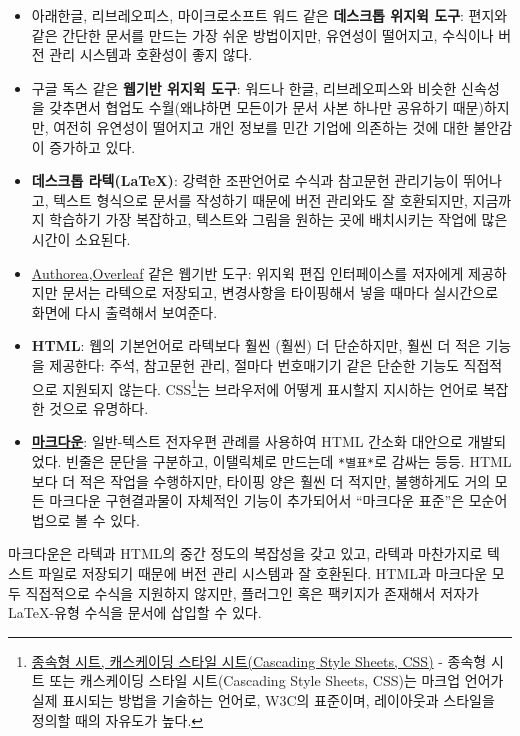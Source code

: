 \documentclass[
  letterpaper,
]{book}
\providecommand{\tightlist}{%
  \setlength{\itemsep}{0pt}\setlength{\parskip}{0pt}}\usepackage{longtable,booktabs,array}
\begin{document}
\begin{itemize}
\item
  아래한글, 리브레오피스, 마이크로소프트 워드 같은 \textbf{데스크톱
  위지윅 도구}: 편지와 같은 간단한 문서를 만드는 가장 쉬운 방법이지만,
  유연성이 떨어지고, 수식이나 버전 관리 시스템과 호환성이 좋지 않다.
\item
  구글 독스 같은 \textbf{웹기반 위지윅 도구}: 워드나 한글,
  리브레오피스와 비슷한 신속성을 갖추면서 협업도 수월(왜냐하면 모든이가
  문서 사본 하나만 공유하기 때문)하지만, 여전히 유연성이 떨어지고 개인
  정보를 민간 기업에 의존하는 것에 대한 불안감이 증가하고 있다.
\item
  \textbf{데스크톱 라텍(LaTeX)}: 강력한 조판언어로 수식과 참고문헌
  관리기능이 뛰어나고, 텍스트 형식으로 문서를 작성하기 때문에 버전
  관리와도 잘 호환되지만, 지금까지 학습하기 가장 복잡하고, 텍스트와
  그림을 원하는 곳에 배치시키는 작업에 많은 시간이 소요된다.
\item
  \href{https://www.authorea.com/}{Authorea},\href{https://www.overleaf.com/}{Overleaf}
  같은 웹기반 도구: 위지윅 편집 인터페이스를 저자에게 제공하지만 문서는
  라텍으로 저장되고, 변경사항을 타이핑해서 넣을 때마다 실시간으로 화면에
  다시 출력해서 보여준다.
\item
  \textbf{HTML}: 웹의 기본언어로 라텍보다 훨씬 (훨씬) 더 단순하지만,
  훨씬 더 적은 기능을 제공한다: 주석, 참고문헌 관리, 절마다 번호매기기
  같은 단순한 기능도 직접적으로 지원되지 않는다. CSS\footnote{\href{https://ko.wikipedia.org/wiki/종속형_시트}{종속형
    시트, 캐스케이딩 스타일 시트(Cascading Style Sheets, CSS)} - 종속형
    시트 또는 캐스케이딩 스타일 시트(Cascading Style Sheets, CSS)는
    마크업 언어가 실제 표시되는 방법을 기술하는 언어로, W3C의 표준이며,
    레이아웃과 스타일을 정의할 때의 자유도가 높다.}는 브라우저에 어떻게
  표시할지 지시하는 언어로 복잡한 것으로 유명하다.
\end{itemize}

\begin{itemize}
\tightlist
\item
  \href{http://daringfireball.net/projects/markdown/}{\textbf{마크다운}}:
  일반-텍스트 전자우편 관례를 사용하여 HTML 간소화 대안으로 개발되었다.
  빈줄은 문단을 구분하고, 이탤릭체로 만드는데 \texttt{*별표*}로 감싸는
  등등. HTML보다 더 적은 작업을 수행하지만, 타이핑 양은 훨씬 더 적지만,
  불행하게도 거의 모든 마크다운 구현결과물이 자체적인 기능이 추가되어서
  ``마크다운 표준''은 모순어법으로 볼 수 있다.
\end{itemize}

마크다운은 라텍과 HTML의 중간 정도의 복잡성을 갖고 있고, 라텍과
마찬가지로 텍스트 파일로 저장되기 때문에 버전 관리 시스템과 잘 호환된다.
HTML과 마크다운 모두 직접적으로 수식을 지원하지 않지만, 플러그인 혹은
팩키지가 존재해서 저자가 LaTeX-유형 수식을 문서에 삽입할 수 있다.
\end{document}
